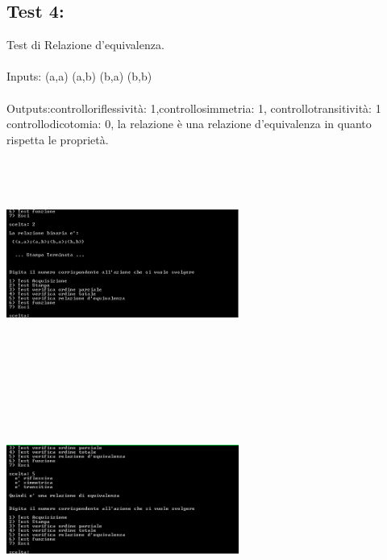 \documentclass[11pt, a4paper, titlepage, block]{article}
\begin{document}
	\subsection{Test 4:}
	Test di Relazione d'equivalenza.\\
	\\
	Inputs: (a,a)  (a,b)  (b,a)  (b,b) \\
	\\
	Outputs:controlloriflessivit\`a:  1,controllosimmetria:  1, controllotransitivit\`a:  1
	controllodicotomia:  0, la relazione \`e una relazione d'equivalenza in quanto rispetta le propriet\`a.\\
	\includegraphics[width=3in,height=3in,viewport=0 0 300 300]{../Screenshots/Test4Input.png}
	\\
	\includegraphics[width=3in,height=3in,viewport=0 0 300 300]{../Screenshots/Test4Output.png}
	\\
	\\
	\newpage
\end{document}
